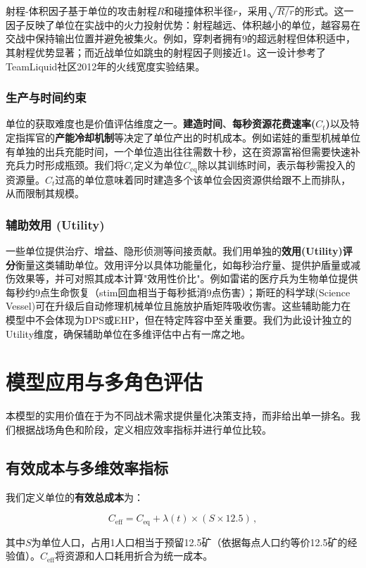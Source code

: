 \documentclass[a4paper,12pt]{article}
\begin{document}
\begin{CJK}{UTF8}{gbsn}
射程-体积因子基于单位的攻击射程$R$和碰撞体积半径$r$，采用$\sqrt{R/r}$的形式。这一因子反映了单位在实战中的火力投射优势：射程越远、体积越小的单位，越容易在交战中保持输出位置并避免被集火。例如，穿刺者拥有9的超远射程但体积适中，其射程优势显著；而近战单位如跳虫的射程因子则接近1。这一设计参考了TeamLiquid社区2012年的火线宽度实验结果。

\subsubsection{生产与时间约束}
单位的获取难度也是价值评估维度之一。\textbf{建造时间}、\textbf{每秒资源花费速率($C_t$)}以及特定指挥官的\textbf{产能冷却机制}等决定了单位产出的时机成本。例如诺娃的重型机械单位有单独的出兵充能时间，一个单位造出往往需数十秒，这在资源富裕但需要快速补充兵力时形成瓶颈。我们将$C_t$定义为单位$C_{\text{eq}}$除以其训练时间，表示每秒需投入的资源量。$C_t$过高的单位意味着同时建造多个该单位会因资源供给跟不上而排队，从而限制其规模。

\subsubsection{辅助效用 (Utility)}
一些单位提供治疗、增益、隐形侦测等间接贡献。我们用单独的\textbf{效用(Utility)评分}衡量这类辅助单位。效用评分以具体功能量化，如每秒治疗量、提供护盾量或减伤效果等，并可对照其成本计算"效用性价比"。例如雷诺的医疗兵为生物单位提供每秒约9点生命恢复（stim回血相当于每秒抵消9点伤害）；斯旺的科学球(Science Vessel)可在升级后自动修理机械单位且施放护盾矩阵吸收伤害。这些辅助能力在模型中不会体现为DPS或EHP，但在特定阵容中至关重要。我们为此设计独立的Utility维度，确保辅助单位在多维评估中占有一席之地。

\section{模型应用与多角色评估}
本模型的实用价值在于为不同战术需求提供量化决策支持，而非给出单一排名。我们根据战场角色和阶段，定义相应效率指标并进行单位比较。

\subsection{有效成本与多维效率指标}
我们定义单位的\textbf{有效总成本}为：

$$
C_{\text{eff}} = C_{\text{eq}} + \lambda(t) \times (S \times 12.5)\,,
$$

其中$S$为单位人口，占用1人口相当于预留12.5矿（依据每点人口约等价12.5矿的经验值）。$C_{\text{eff}}$将资源和人口耗用折合为统一成本。


\end{CJK}
\end{document}

